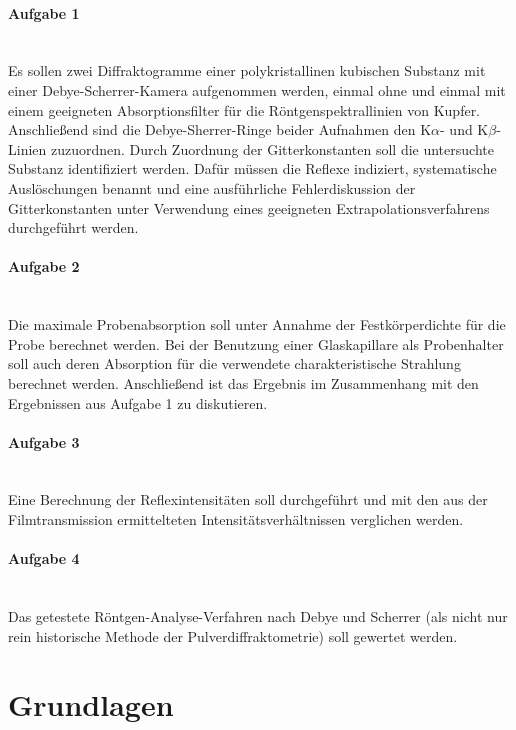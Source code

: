 \documentclass[a4paper,twoside,final]{article}
\begin{document}
\paragraph{Aufgabe 1}$~$\\
 Es sollen zwei Diffraktogramme einer polykristallinen kubischen Substanz mit einer Debye\--Scherrer\--Ka\-me\-ra aufgenommen werden, einmal ohne und einmal mit einem geeigneten Absorptionsfilter für die Röntgenspektrallinien von Kupfer. Anschließend sind die Debye-Sherrer-Ringe beider Aufnahmen den K$\alpha$- und K$\beta$- Linien zuzuordnen. Durch Zuordnung der Gitterkonstanten soll die untersuchte Substanz identifiziert werden. Dafür müssen die Reflexe indiziert, systematische Auslöschungen benannt und eine ausführliche Fehlerdiskussion der Gitterkonstanten unter Verwendung eines geeigneten Extrapolationsverfahrens durchgeführt werden.
\paragraph{Aufgabe 2}$~$\\
Die maximale Probenabsorption soll unter Annahme der Festkörperdichte für die Probe berechnet werden. Bei der Benutzung einer Glaskapillare als Probenhalter soll auch deren Absorption für die verwendete charakteristische Strahlung berechnet werden. Anschließend ist das Ergebnis im Zusammenhang mit den Ergebnissen aus Aufgabe 1 zu diskutieren.
\paragraph{Aufgabe 3}$~$\\
Eine Berechnung der Reflexintensitäten soll durchgeführt und mit den aus der Filmtransmission ermittelteten Intensitätsverhältnissen verglichen werden.
\paragraph{Aufgabe 4}$~$\\
Das getestete Röntgen-Analyse-Verfahren nach Debye und Scherrer (als nicht nur rein \glqq historische\grqq{} Methode der Pulverdiffraktometrie) soll gewertet werden.


\section{Grundlagen} \label{sec:Grundlagen}
\end{document}
